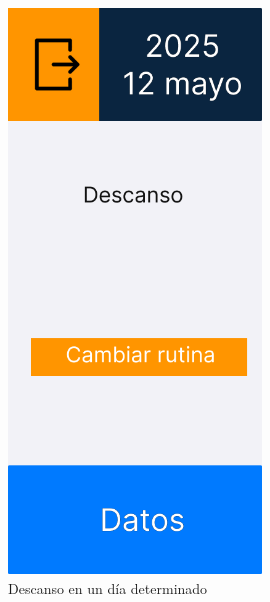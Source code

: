 \begin{figure}[H]
   \centering
    \includegraphics[width=0.6\textwidth]{fotos/Frame 27.png}
    \caption{Descanso en un día determinado}
    \label{fig:Descanso en un día determinado}
\end{figure}

